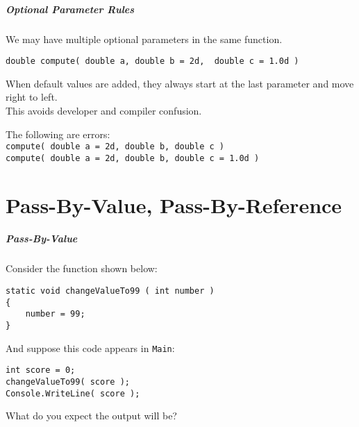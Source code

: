 \begin{frame}[fragile]
\frametitle{Optional Parameter Rules}
We may have multiple optional parameters in the same function.
\vspace{-5em}

\begin{verbatim}
double compute( double a, double b = 2d,  double c = 1.0d )
\end{verbatim}

\vspace{-2em}

When default values are added, they always start at the last parameter and move right to left.\\
\quad This avoids developer and compiler confusion.

The following are errors:\\
\quad \texttt{compute( double a = 2d, double b,  double c )}\\
\quad \texttt{compute( double a = 2d, double b,  double c = 1.0d )}\\

\end{frame}



\part{Pass-By-Value, Pass-By-Reference}
\begin{frame}\partpage\end{frame}

\begin{frame}[fragile]
\frametitle{Pass-By-Value}
Consider the function shown below:

\begin{verbatim}
static void changeValueTo99 ( int number )
{
    number = 99;
}
\end{verbatim}

And suppose this code appears in \texttt{Main}:
\begin{verbatim}
int score = 0;
changeValueTo99( score );
Console.WriteLine( score );
\end{verbatim}

What do you expect the output will be?

\end{frame}

